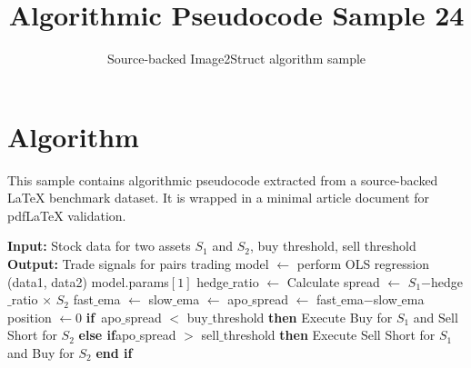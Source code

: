 \documentclass[11pt]{article}
\title{Algorithmic Pseudocode Sample 24}
\author{Source-backed Image2Struct algorithm sample}
\date{}
\begin{document}
\maketitle
\section{Algorithm}
This sample contains algorithmic pseudocode extracted from a source-backed LaTeX benchmark dataset. It is wrapped in a minimal article document for pdfLaTeX validation.

\begin{algorithm}[htbp]
\caption{Source-backed algorithmic procedure}
\begin{algorithmic}[1]
\State \textbf{Input:} Stock data for two assets $S_1$ and $S_2$, buy threshold, sell threshold
\State \textbf{Output:} Trade signals for pairs trading
\State
{}
\State model $\gets$ perform OLS regression (data1, data2)
\State \Return model.params$[1]$
\EndProcedure
\State
{}
\State hedge$\_$ratio $\gets$ 
\State Calculate spread $\gets$ $S_1$$-$hedge$\_$ratio $\times$ $S_2$
\State fast$\_$ema $\gets$ 
\State slow$\_$ema $\gets$ 
\State apo$\_$spread $\gets$ fast$\_$ema$-$slow$\_$ema
\State position $\gets 0$
\EndProcedure
\State
{}
\State \textbf{if}{~apo$\_$spread $<$ buy$\_$threshold} \textbf{then}
\State \hspace{1cm} Execute Buy for $S_1$ and Sell Short for $S_2$
\State \textbf{else if}{apo$\_$spread $>$ sell$\_$threshold} \textbf{then}
\State \hspace{1cm} Execute Sell Short for $S_1$ and Buy for $S_2$
\State \textbf{end if}
\EndProcedure
\end{algorithmic}
\end{algorithm}
\end{document}
